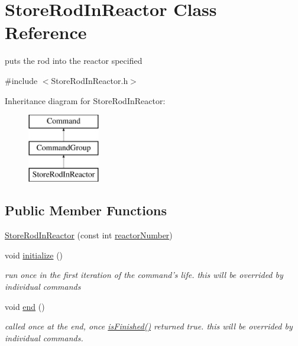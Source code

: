 \hypertarget{classStoreRodInReactor}{\section{Store\-Rod\-In\-Reactor Class Reference}
\label{classStoreRodInReactor}
}


puts the rod into the reactor specified  




{\ttfamily \#include $<$Store\-Rod\-In\-Reactor.\-h$>$}

Inheritance diagram for Store\-Rod\-In\-Reactor\-:\begin{figure}[H]
\begin{center}
\leavevmode
\includegraphics[height=3.000000cm]{classStoreRodInReactor}
\end{center}
\end{figure}
\subsection*{Public Member Functions}
\begin{DoxyCompactItemize}
\item 
\hyperlink{classStoreRodInReactor_a1a72a4e2f134e009b8c911efd4ced737}{Store\-Rod\-In\-Reactor} (const int \hyperlink{classStoreRodInReactor_a5d989548741b48953a5bb4e20f294d72}{reactor\-Number})
\item 
void \hyperlink{classStoreRodInReactor_aa315630b1fcbb752dcc7f6425c96959f}{initialize} ()
\begin{DoxyCompactList}\small\item\em run once in the first iteration of the command's life. this will be overrided by individual commands \end{DoxyCompactList}\item 
void \hyperlink{classStoreRodInReactor_a39f60444f52164e7405331e61b050e83}{end} ()
\begin{DoxyCompactList}\small\item\em called once at the end, once \hyperlink{classCommandGroup_a96807a2763adf9e21ebf2cb9e3574e3c}{is\-Finished()} returned true. this will be overrided by individual commands. \end{DoxyCompactList}\end{DoxyCompactItemize}
